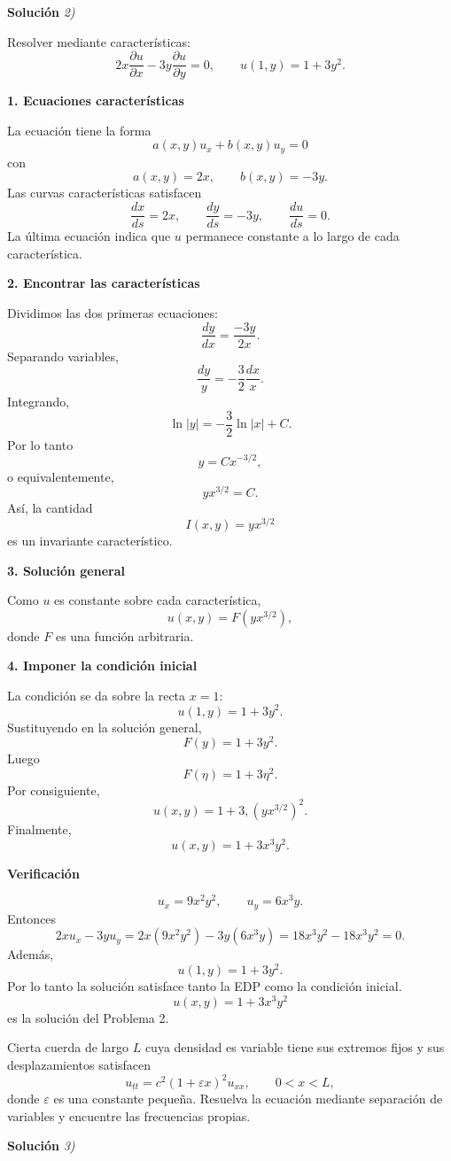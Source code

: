 \documentclass[11pt,spanish]{article}
\newcounter{problema}
\newcommand{\prob}{\stepcounter{problema} \vspace{.5cm} \noindent{\bf Problema \arabic{problema}: }}
\begin{document}
\vspace{0.5cm}
{\bf Soluci\'on }{\em 2)}
\vspace{0.5cm}

Resolver mediante características:
$$
2x\frac{\partial u}{\partial x}-3y\frac{\partial u}{\partial y}=0,
\qquad
u(1,y)=1+3y^2.
$$

{\bf 1. Ecuaciones características}

La ecuación tiene la forma
$$
a(x,y)u_x+b(x,y)u_y=0
$$
con
$$
a(x,y)=2x,\qquad b(x,y)=-3y.
$$
Las curvas características satisfacen
$$
\frac{dx}{ds}=2x,
\qquad
\frac{dy}{ds}=-3y,
\qquad
\frac{du}{ds}=0.
$$
La última ecuación indica que $u$ permanece constante a lo largo de cada característica.

{\bf 2. Encontrar las características}

Dividimos las dos primeras ecuaciones:
$$
\frac{dy}{dx}
=
\frac{-3y}{2x}.
$$
Separando variables,
$$
\frac{dy}{y}
=
-\frac32\frac{dx}{x}.
$$
Integrando,
$$
\ln|y|
=
-\frac32\ln|x|+C.
$$
Por lo tanto
$$
y=Cx^{-3/2},
$$
o equivalentemente,
$$
yx^{3/2}=C.
$$
Así, la cantidad
$$
\boxed{I(x,y)=yx^{3/2}}
$$
es un invariante característico.

{\bf 3. Solución general}

Como $u$ es constante sobre cada característica,
$$
u(x,y)=F(yx^{3/2}),
$$
donde $F$ es una función arbitraria.

{\bf 4. Imponer la condición inicial}

La condición se da sobre la recta $x=1$:
$$
u(1,y)=1+3y^2.
$$
Sustituyendo en la solución general,
$$
F(y)=1+3y^2.
$$
Luego
$$
F(\eta)=1+3\eta^2.
$$
Por consiguiente,
$$
u(x,y)
=
1+3,(yx^{3/2})^2.
$$
Finalmente,
$$
\boxed{
u(x,y)=1+3x^3y^2.
}
$$

{\bf Verificación}

$$
u_x=9x^2y^2,
\qquad
u_y=6x^3y.
$$
Entonces
$$
2xu_x-3yu_y
=
2x(9x^2y^2)-3y(6x^3y)
=
18x^3y^2-18x^3y^2
=
0.
$$
Además,
$$
u(1,y)=1+3y^2.
$$
Por lo tanto la solución satisface tanto la EDP como la condición inicial.
$$
\boxed{u(x,y)=1+3x^3y^2}
$$
es la solución del Problema 2.



\prob Cierta cuerda de largo $L$ cuya densidad es variable tiene sus extremos fijos y sus desplazamientos satisfacen
\[
u_{tt} = c^2(1+\varepsilon x)^2 u_{xx}, \qquad 0<x<L,
\]
donde $\varepsilon$ es una constante pequeña. Resuelva la ecuación mediante separación de variables y encuentre las frecuencias propias.

\vspace{0.5cm}
{\bf Soluci\'on }{\em 3)}
\vspace{0.5cm}
\end{document}
